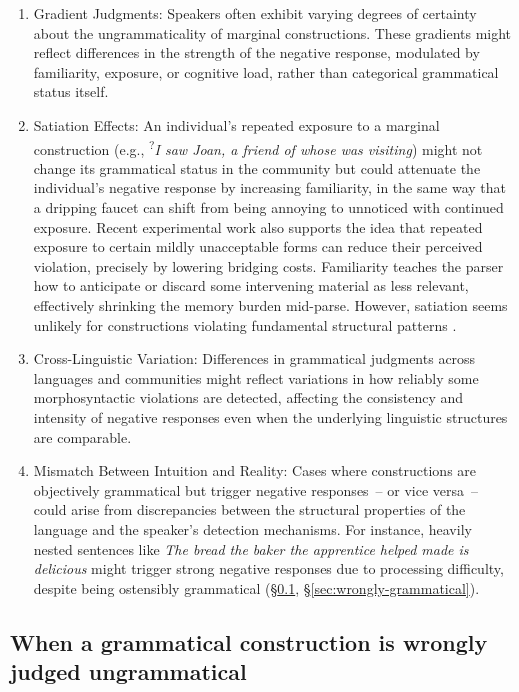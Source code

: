 \documentclass[12pt,letterpaper]{article}
\begin{document}
\begin{enumerate}
    \item Gradient Judgments: Speakers often exhibit varying degrees of certainty about the ungrammaticality of marginal constructions. These gradients might reflect differences in the strength of the negative response, modulated by familiarity, exposure, or cognitive load, rather than categorical grammatical status itself.

    \item Satiation Effects: An individual's repeated exposure to a marginal construction (e.g., \textsuperscript{?}\textit{I saw Joan, a friend of whose was visiting}) might not change its grammatical status in the community but could attenuate the individual's negative response by increasing familiarity, in the same way that a dripping faucet can shift from being annoying to unnoticed with continued exposure. Recent experimental work \autocite{hawkins2014,Gibson2024} also supports the idea that repeated exposure to certain mildly unacceptable forms can reduce their perceived violation, precisely by lowering bridging costs. Familiarity teaches the parser how to anticipate or discard some intervening material as less relevant, effectively shrinking the memory burden mid-parse. However, satiation seems unlikely for constructions violating fundamental structural patterns \autocite[cf.][]{Snyder2022}.

    \item Cross-Linguistic Variation: Differences in grammatical judgments across languages and communities might reflect variations in how reliably some morphosyntactic violations are detected, affecting the consistency and intensity of negative responses even when the underlying linguistic structures are comparable.

    \item Mismatch Between Intuition and Reality: Cases where constructions are objectively grammatical but trigger negative responses~-- or vice versa~-- could arise from discrepancies between the structural properties of the language and the speaker's detection mechanisms. For instance, heavily nested sentences like \textit{The bread the baker the apprentice helped made is delicious} might trigger strong negative responses due to processing difficulty, despite being ostensibly grammatical (\S\ref{sec:wrongly-ungrammatical}, \S\ref{sec:wrongly-grammatical}).
\end{enumerate}

\subsection{When a grammatical construction is wrongly judged ungrammatical}\label{sec:wrongly-ungrammatical}
\end{document}
